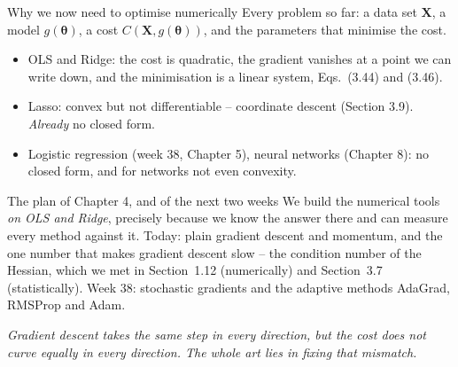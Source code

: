 \documentclass[10pt,aspectratio=169]{beamer}
\begin{document}
\begin{frame}{Why we now need to optimise numerically}
Every problem so far: a data set $\bm{X}$, a model $g(\bm{\theta})$, a cost
$C(\bm{X},g(\bm{\theta}))$, and the parameters that minimise the cost.
\begin{itemize}
  \item OLS and Ridge: the cost is quadratic, the gradient vanishes at a point
        we can write down, and the minimisation is a linear system,
        Eqs.~(3.44) and (3.46).
  \item Lasso: convex but not differentiable -- coordinate descent
        (Section 3.9).  \emph{Already} no closed form.
  \item Logistic regression (week 38, Chapter 5), neural networks (Chapter 8): no
        closed form, and for networks not even convexity.
\end{itemize}
\vspace{4pt}
\begin{block}{The plan of Chapter 4, and of the next two weeks}
We build the numerical tools \emph{on OLS and Ridge}, precisely because we
know the answer there and can measure every method against it.  Today:
plain gradient descent and momentum, and the one number that makes gradient
descent slow -- the condition number of the Hessian, which we met in
Section~1.12 (numerically) and Section~3.7 (statistically).  Week 38:
stochastic gradients and the adaptive methods AdaGrad, RMSProp and Adam.
\end{block}
\vspace{2pt}
\centering
\emph{Gradient descent takes the same step in every direction, but the cost
does not curve equally in every direction.  The whole art lies in fixing that
mismatch.}
\end{frame}
\end{document}
